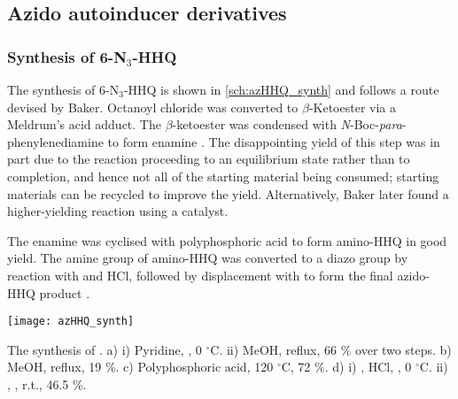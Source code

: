\subsection{Azido autoinducer derivatives}

\subsubsection{Synthesis of 6-N$_3$-HHQ }

The synthesis of 6-N$_3$-HHQ  is shown in \ref{sch:azHHQ_synth} and follows a route devised by Baker\cite{Baker2015}. Octanoyl chloride  was converted to $\beta$-Ketoester  via a Meldrum's acid adduct\cite{Baker2012,Scribner1978}. The $\beta$-ketoester  was condensed with \textit{N}-Boc-\textit{para}-phenylenediamine  to form enamine . The disappointing yield of this step was in part due to the reaction proceeding to an equilibrium state rather than to completion, and hence not all of the starting material being consumed; starting materials can be recycled to improve the yield. Alternatively, Baker later found a higher-yielding reaction using a  catalyst.

The enamine  was cyclised with polyphosphoric acid to form amino-HHQ  in good yield. The amine group of amino-HHQ  was converted to a diazo group by reaction with  and HCl, followed by displacement with  to form the final azido-HHQ product \cite{Xu2013}.

\begin{scheme}[H]
	\begin{center}
		\texttt{[image: azHHQ\_synth]}
		\caption{The synthesis of . 
		a) i) Pyridine, , 0 $^{\circ}$C. ii) MeOH, reflux, 66 \% over two steps. 
		b) MeOH, reflux, 19 \%. 
		c) Polyphosphoric acid, 120 $^{\circ}$C, 72 \%. 
		d) i) , HCl, , 0 $^{\circ}$C. ii) , , r.t., 46.5 \%.
		\label{sch:azHHQ_synth}}
	\end{center}
\end{scheme}

